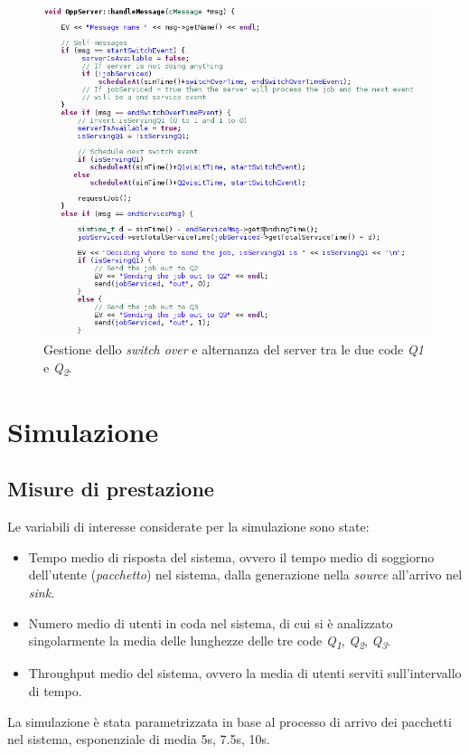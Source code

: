 \documentclass[a4paper,11pt]{article}
\begin{document}
\begin{figure}[h!]
    \centering
    \includegraphics[width=\linewidth]{images/handle-message-oppserver.png}
    \caption{Gestione dello \textit{switch over} e alternanza del server tra le due code \textit{Q\textit{1}} e \textit{Q\textsubscript{2}}.}
    \label{fig:1}
\end{figure}
\newpage
\section{Simulazione}


\subsection{Misure di prestazione}
Le variabili di interesse considerate per la simulazione sono state:
\begin{itemize}
    \item Tempo medio di risposta del sistema, ovvero il tempo medio di soggiorno dell'utente (\textit{pacchetto}) nel sistema, dalla generazione nella \textit{source} all'arrivo nel \textit{sink}.
    \item Numero medio di utenti in coda nel sistema, di cui si è analizzato singolarmente la media delle lunghezze delle tre code \textit{Q\textsubscript{1}}, \textit{Q\textsubscript{2}}, \textit{Q\textsubscript{3}}.
    \item Throughput medio del sistema, ovvero la media di utenti serviti sull'intervallo di tempo.
\end{itemize}
La simulazione è stata parametrizzata in base al processo di arrivo dei pacchetti nel sistema, esponenziale di media {5s, 7.5s, 10s}.
\end{document}
